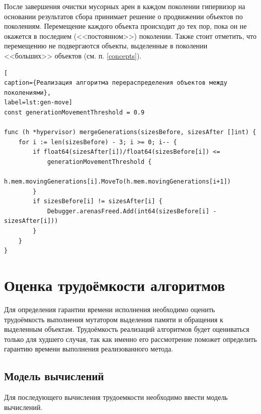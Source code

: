 После завершения очистки мусорных арен в каждом поколении гипервизор на основании результатов сбора принимает решение о продвижении объектов по поколениям. Перемещение каждого объекта происходит до тех пор, пока он не окажется в последнем (<<постоянном>>) поколении. Также стоит отметить, что перемещению не подвергаются объекты, выделенные в поколении <<больших>> объектов (см. п. \ref{concepts}).

\begin{lstlisting}[
caption={Реализация алгоритма перераспределения объектов между поколениями},
label=lst:gen-move]
const generationMovementThreshold = 0.9

func (h *hypervisor) mergeGenerations(sizesBefore, sizesAfter []int) {
	for i := len(sizesBefore) - 3; i >= 0; i-- {
		if float64(sizesAfter[i])/float64(sizesBefore[i]) <=
			generationMovementThreshold {
			h.mem.movingGenerations[i].MoveTo(h.mem.movingGenerations[i+1])
		}
		if sizesBefore[i] != sizesAfter[i] {
			Debugger.arenasFreed.Add(int64(sizesBefore[i] - sizesAfter[i]))
		}
	}
}
\end{lstlisting}


\section{Оценка трудоёмкости алгоритмов}

Для определения гарантии времени исполнения необходимо оценить трудоёмкость выполнения мутатором выделения памяти и обращения к выделенным объектам. Трудоёмкость реализаций алгоритмов будет оцениваться только для худшего случая, так как именно его рассмотрение поможет определить гарантию времени выполнения реализованного метода.

\subsection{Модель вычислений}

Для последующего вычисления трудоемкости необходимо ввести модель вычислений.

